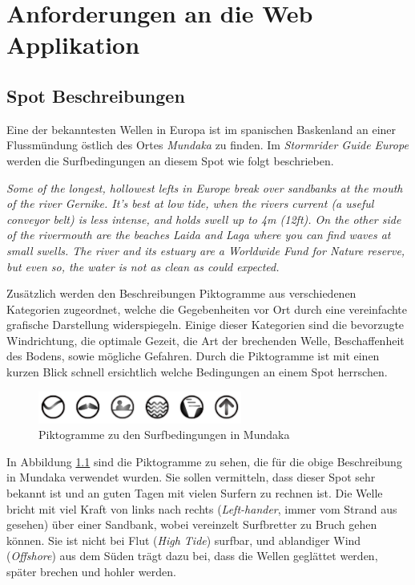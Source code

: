 
\chapter{Anforderungen an die Web Applikation}

\section{Spot Beschreibungen}

Eine der bekanntesten Wellen in Europa ist im spanischen Baskenland an
einer Fluss\-mündung östlich des Ortes \textit{Mundaka} zu finden. Im
\textit{Stormrider Guide Europe} \cite[S.180]{storm_europe_1998}
werden die Surfbedingungen an diesem Spot wie folgt beschrieben.

\textit{Some of the longest, hollowest lefts in Europe break over
  sandbanks at the mouth of the river Gernike. It's best at low tide,
  when the rivers current (a useful conveyor belt) is less intense,
  and holds swell up to 4m (12ft). On the other side of the rivermouth
  are the beaches Laida and Laga where you can find waves at small
  swells. The river and its estuary are a Worldwide Fund for Nature
  reserve, but even so, the water is not as clean as could expected.
}

Zusätzlich werden den Beschreibungen Piktogramme aus verschiedenen
Kategorien zugeordnet, welche die Gegebenheiten vor Ort durch eine
vereinfachte grafische Darstellung widerspiegeln. Einige dieser
Kategorien sind die bevorzugte Windrichtung, die optimale Gezeit, die
Art der brechenden Welle, Beschaffenheit des Bodens, sowie mögliche
Gefahren. Durch die Piktogramme ist mit einen kurzen Blick schnell
ersichtlich welche Bedingungen an einem Spot herrschen.

\begin{figure}[h]
  \begin{center}
    \includegraphics[height=40px]{bilder/mundaka-conditions}
    \caption{Piktogramme zu den Surfbedingungen in Mundaka}
    \label{piktogramm}
  \end{center}
\end{figure}

In Abbildung \ref{piktogramm} sind die Piktogramme zu sehen, die für
die obige Beschreibung in Mundaka verwendet wurden. Sie sollen
vermitteln, dass dieser Spot sehr bekannt ist und an guten Tagen mit
vielen Surfern zu rechnen ist. Die Welle bricht mit viel Kraft von
links nach rechts (\textit{Left-hander}, immer vom Strand aus gesehen)
über einer Sandbank, wobei vereinzelt Surfbretter zu Bruch gehen
können.  Sie ist nicht bei Flut (\textit{High Tide}) surfbar, und
ablandiger Wind (\textit{Offshore}) aus dem Süden trägt dazu bei, dass
die Wellen geglättet werden, später brechen und hohler werden.

